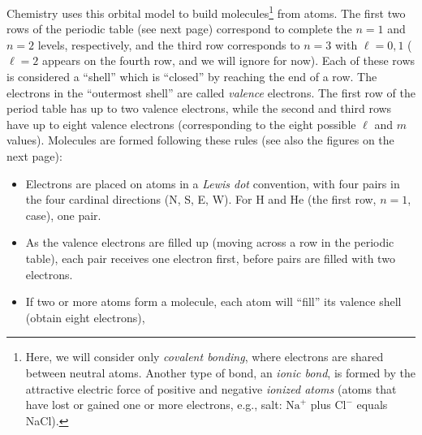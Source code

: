 \documentclass[12pt]{article}
\begin{document}
\begin{enumerate}
	  
	  Chemistry uses this orbital model to build molecules\footnote{Here, we will consider only {\em covalent bonding}, where electrons are shared between neutral atoms.  Another type of bond, an {\em ionic bond},  is formed by the attractive electric force of positive and negative {\em ionized atoms} (atoms that have lost or gained one or more electrons, e.g., salt: $\text{Na}^+$ plus $\text{Cl}^-$ equals NaCl).} from atoms.  The first two rows of the periodic table (see next page) correspond to complete the $n=1$ and $n=2$ levels, respectively, and the third row corresponds to $n=3$ with $\ell = 0, 1$ ($\ell = 2$ appears on the fourth row, and we will ignore for now).  Each of these rows is considered a ``shell'' which is ``closed'' by reaching the end of a row.  The electrons in the ``outermost shell'' are called {\em valence} electrons.  The first row of the period table has up to two valence electrons, while the second and third rows have up to eight valence electrons (corresponding to the eight possible $\ell$ and $m$ values).   Molecules are formed following these rules (see also the figures on the next page):
		\begin{itemize}
		\item Electrons are placed on atoms in a {\em Lewis dot} convention, with four pairs in the four cardinal directions (N, S, E, W). For H and He (the first row,  $n=1$, case), one pair.
		\item As the valence electrons are filled up (moving across a row in the periodic table), each pair receives one electron first, before pairs are filled with two electrons.		
		\item If two or more atoms form a molecule, each atom will ``fill'' its valence shell (obtain eight electrons), 
		\end{itemize}
	


\end{enumerate}
\end{document}
